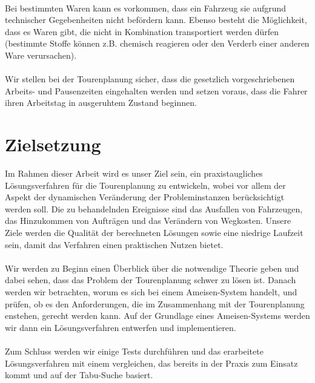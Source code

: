\\
Bei bestimmten Waren kann es vorkommen, dass ein Fahrzeug sie aufgrund technischer Gegebenheiten nicht befördern kann. Ebenso besteht die Möglichkeit, dass es Waren gibt, die nicht in Kombination transportiert werden dürfen (bestimmte Stoffe können z.B. chemisch reagieren oder den Verderb einer anderen Ware verursachen). \\
\\
Wir stellen bei der Tourenplanung sicher, dass die gesetzlich vorgeschriebenen Arbeits- und Pausenzeiten eingehalten werden und setzen voraus, dass die Fahrer ihren Arbeitstag in ausgeruhtem Zustand beginnen.

\section{Zielsetzung}\label{chp:zielsetzung}
Im Rahmen dieser Arbeit wird es unser Ziel sein, ein praxistaugliches Lösungsverfahren für die Tourenplanung zu entwickeln, wobei vor allem der Aspekt der dynamischen Veränderung der Probleminstanzen berücksichtigt werden soll. Die zu behandelnden Ereignisse sind das Ausfallen von Fahrzeugen, das Hinzukommen von Aufträgen und das Verändern von Wegkosten. Unsere Ziele werden die Qualität der berechneten Lösungen sowie eine niedrige Laufzeit sein, damit das Verfahren einen praktischen Nutzen bietet. \\
\\
Wir werden zu Beginn einen Überblick über die notwendige Theorie geben und dabei sehen, dass das Problem der Tourenplanung schwer zu lösen ist. Danach werden wir betrachten, worum es sich bei einem  Ameisen-System handelt, und prüfen, ob es den Anforderungen, die im Zusammenhang mit der Tourenplanung enstehen, gerecht werden kann. Auf der Grundlage eines Ameisen-Systems werden wir dann ein Lösungsverfahren entwerfen und implementieren.  \\
\\
Zum Schluss werden wir einige Tests durchführen und das erarbeitete Lösungsverfahren mit einem vergleichen, das bereits in der Praxis zum Einsatz kommt und auf der Tabu-Suche basiert.